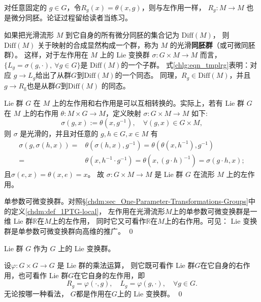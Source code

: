 对任意固定的 $g \in G$，令$R_g(x)=\theta(x,g)$，则与左作用一样，
$R_g: M \to M$ 也是微分同胚。论证过程留给读者当练习。

如果把光滑流形 $M$ 到它自身的所有微分同胚的集合记为 $\mathrm{Diff}(M)$，
则 $\mathrm{Diff}(M)$ 关于映射的合成显然构成一个群，称为 $M$ 的光滑\textbf{同胚群}（或可微同胚群）。
这样，对于左作用在 $M$ 上的 Lie 变换群 $\sigma: G \times M \to M$ 而言，
$\{L_g=\sigma(g,\cdot),\ \forall g \in G\}$是 $\mathrm{Diff}(M)$的一个子群。
式\eqref{chlg:eqn_tmplrg}表明：对应 $g \to L_{g}$给出了从群$G$到$\mathrm{Diff}(M)$的一个同态。
同理，$R_g \in \mathrm{Diff}(M)$，并且 $g \to R_{\mathrm{g}}$也是从群$G$到$\mathrm{Diff}(M)$ 的同态。

 Lie 群 $G$ 在 $M$ 上的左作用和右作用是可以互相转换的。实际上，若有 Lie 群 $G$ 在 $M$
上的右作用 $\theta: M \times G \to M$，定义映射 $\sigma: G \times M \to M$ 如下:
\begin{equation}
    \sigma(g, x):= \theta(x, g^{-1}), \quad \forall(g, x) \in G \times M,
\end{equation}
则 $\sigma$ 是光滑的，并且对任意的 $g, h \in G, x \in M$ 有
\begin{align*}
    \sigma(g, \sigma(h, x))=&\theta\left(\sigma(h, x), g^{-1}\right)
    =  \theta\left(\theta\left(x, h^{-1}\right), g^{-1}\right) \\
    =& \theta\left(x, h^{-1} \cdot g^{-1}\right)
    = \theta\left(x,(g \cdot h)^{-1}\right)=\sigma(g \cdot h, x) ;
\end{align*}
且$\sigma(e, x)=\theta(x, e)=x$。
故 $\sigma: G \times M \rightarrow M$ 是 Lie 群 $G$ 在流形 $M$ 上的左作用。

\begin{example}
    单参数可微变换群。对照\S\ref{chdm:sec_One-Parameter-Transformations-Groups}中的定义\ref{chdm:def_1PTG-local}，
    左作用在光滑流形$M$上的单参数可微变换群是一维 Lie 群$\mathbb{R}$在$M$上的左作用，
    同时它又可看作$\mathbb{R}$在$M$上的右作用。可见：
     Lie 变换群是单参数可微变换群向高维的推广。 \qed
\end{example}

\begin{example}
     Lie 群 $G$ 作为 $G$ 上的 Lie 变换群。
\end{example}
设$\varphi: G \times G \rightarrow G$ 是 Lie 群的乘法运算，
则它既可看作 Lie 群$G$在它自身的右作用，也可看作 Lie 群$G$在它自身的左作用，即
\begin{equation}
    R_g=\varphi(\cdot, g), \quad L_g=\varphi(g, \cdot), \quad \forall g \in G .
\end{equation}
无论按哪一种看法， $G$都是作用在$G$上的 Lie 变换群。
\qed

